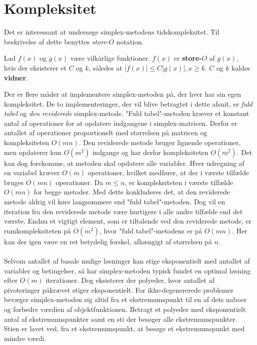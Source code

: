 \section{Kompleksitet}
Det er interessant at undersøge simplex-metodens tidskompleksitet.
Til beskrivelse af dette benyttes \textit{store-$O$} notation.
%
\begin{defn}{}{}
Lad $f(x)$ og $g(x)$ være vilkårlige funktioner. $f(x)$ er \textbf{store-$O$} af $g(x)$, hvis der eksisterer et $C$ og $k$, således at $|f(x)| \leq C|g(x)|, x \geq k$. $C$ og $k$ kaldes \textbf{vidner}.
\end{defn}\noindent
%
Der er flere måder at implementere simplex-metoden på, der hver har sin egen kompleksitet.
De to implementeringer, der vil blive betragtet i dette afsnit, er \textit{fuld tabel} og \textit{den reviderede} simplex-metode.
%
"Fuld tabel"-metoden kræver et konstant antal af operationer for at opdatere indgangene i simplex-matricen.
Derfor er antallet af operationer proportionelt med størrelsen på matricen og kompleksiteten $O(mn)$.
Den reviderede metode bruger lignende operationer, men opdaterer kun $O(m^2)$ indgange og har derfor kompleksiteten $O(m^2)$.
Det kan dog forekomme, at metoden skal opdatere alle variabler.
Hver udregning af en variabel kræver $O(m)$ operationer, hvilket medfører, at der i værste tilfælde bruges $O(mn)$ operationer.
Da $m \leq n$, er kompleksiteten i værste tilfælde $O(mn)$ for begge metoder.
Med dette konkluderes det, at den reviderede metode aldrig vil køre langsommere end "fuld tabel"-metoden.
Dog vil en iteration fra den reviderede metode være hurtigere i alle andre tilfælde end det værste.
Endnu et vigtigt element, som er tiltalende ved den reviderede metode, er rumkompleksiteten på $O(m^2)$, hvor "fuld tabel"-metodens er på $O(mn)$.
Her kan der igen være en ret betydelig forskel, afhængigt af størrelsen på $n$.\\\\
%
Selvom antallet af basale mulige løsninger kan stige eksponentielt med antallet af variabler og betingelser, så har simplex-metoden typisk fundet en optimal løsning efter $O(m)$ iterationer.
Dog eksisterer der polyeder, hvor antallet af pivoteringer påkrævet stiger eksponentielt.
For ikke-degenererede problemer bevæger simplex-metoden sig altid fra et ekstremumspunkt til en af dets naboer og forbedre værdien af objektfunktionen.
Betragt et polyeder med eksponentielt antal af ekstremumspunkter samt en sti der besøger alle ekstremumspunkter.
Stien er lavet ved, fra et ekstremumspunkt, at besøge et ekstremumspunkt med mindre værdi.
